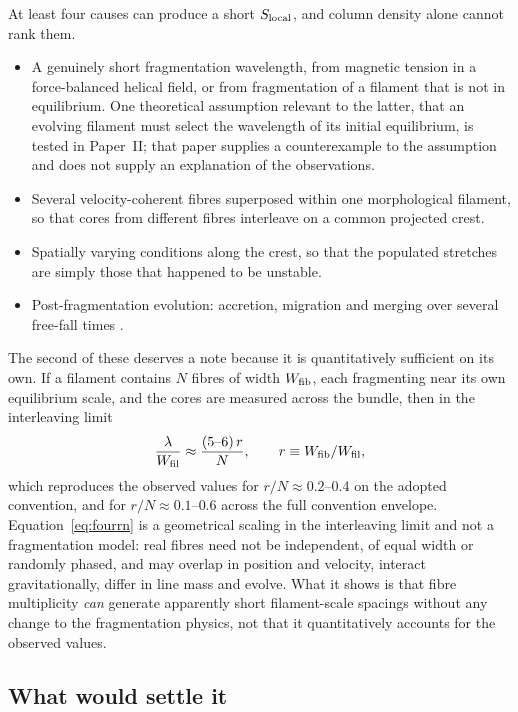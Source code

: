 \documentclass[usenatbib,twoside,twocolumn]{mnras}
\begin{document}
At least four causes can produce a short $S_{\rm local}$, and column density alone cannot rank them.

\begin{itemize}\setlength{\itemsep}{1pt}
\item A genuinely short fragmentation wavelength, from magnetic tension in a force-balanced helical field, or from fragmentation of a filament that is not in equilibrium. One theoretical assumption relevant to the latter, that an evolving filament must select the wavelength of its initial equilibrium, is tested in Paper~II; that paper supplies a counterexample to the assumption and does not supply an explanation of the observations.
\item Several velocity-coherent fibres superposed within one morphological filament, so that cores from different fibres interleave on a common projected crest.
\item Spatially varying conditions along the crest, so that the populated stretches are simply those that happened to be unstable.
\item Post-fragmentation evolution: accretion, migration and merging over several free-fall times \citep{Kirk2016,Mattern2018,Clarke2020}.
\end{itemize}

The second of these deserves a note because it is quantitatively sufficient on its own. If a filament contains $N$ fibres of width $W_{\rm fib}$, each fragmenting near its own equilibrium scale, and the cores are measured across the bundle, then in the interleaving limit
\begin{equation}
\frac{\lambda}{W_{\rm fil}}\approx\frac{(5\text{--}6)\,r}{N},\qquad r\equiv W_{\rm fib}/W_{\rm fil},
\label{eq:fourrn}
\end{equation}
which reproduces the observed values for $r/N\approx0.2$--$0.4$ on the adopted convention, and for $r/N\approx0.1$--$0.6$ across the full convention envelope. Equation~\ref{eq:fourrn} is a geometrical scaling in the interleaving limit and not a fragmentation model: real fibres need not be independent, of equal width or randomly phased, and may overlap in position and velocity, interact gravitationally, differ in line mass and evolve. What it shows is that fibre multiplicity \emph{can} generate apparently short filament-scale spacings without any change to the fragmentation physics, not that it quantitatively accounts for the observed values.

\subsection{What would settle it}
\label{sec:settle}
\end{document}
